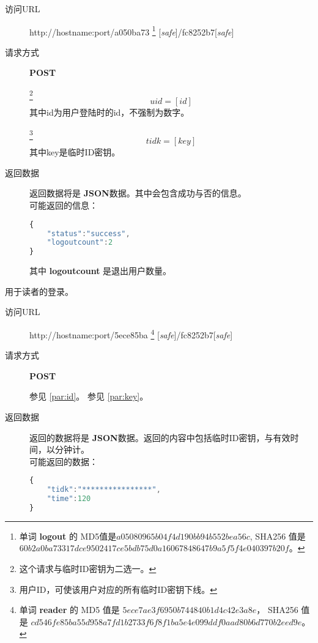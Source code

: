 \documentclass[UTF8]{ctexart}
\def\safe{[\textit{safe}]}
\def\POST{\textbf{POST}}
\def\bfJSON{\textbf{JSON}}
\begin{document}
    
    
    
    
    
    

    \begin{description}
        \item[访问URL] http://hostname:port/a050ba73
        \footnote{
            单词 \textbf{logout} 的
            MD5值是$a05080965b04f4d190bb94b552bea56c $,
            SHA256 值是
            $60b2a0ba73317dce9502417ce5bdb75d0a16067848647b9a5f5f4e040397b20f$。
        }
        [\textit{safe}]/fc8252b7[\textit{safe}]
        
        \item[请求方式] \textbf{POST}
        
        \label{par:logout:id}
        \footnote{这个请求与临时ID密钥为二选一。}
        $$uid=[id]$$
        其中id为用户登陆时的id，不强制为数字。
        
        \label{par:logout:tidk}
        \footnote{用户ID，可使该用户对应的所有临时ID密钥下线。}
        $$tidk=[key]$$
        其中key是临时ID密钥。
        
        \item[返回数据] 返回数据将是 \bfJSON 数据。其中会包含成功与否的信息。
        \\可能返回的信息：
        \begin{lstlisting}[language=JavaScript]
{
    "status":"success",
    "logoutcount":2
}
        \end{lstlisting}\label{par:logout:example}
        其中 \textbf{logoutcount} 是退出用户数量。
    \end{description}
    
    
    
    
    
    
		用于读者的登录。
		\begin{description}
            
		\item[访问URL] http://hostname:port/5ece85ba
        \footnote{单词 \textbf{reader} 的
            MD5 值是 
            $5ece7ae3f6950b744840b1d4c42e3a8e$，
            SHA256 值是
            $cd546fe85ba55d958a7fd1b2733f6f8f1ba5e4e099ddf0aad80b6d770b2eed9e$。
            }
        \safe/fc8252b7\safe
        
        \item[请求方式] \POST
        
         参见 \ref{par:id}。
         参见 \ref{par:key}。
        \item[返回数据] 返回的数据将是 \bfJSON 数据。返回的内容中包括临时ID密钥，与有效时间，以分钟计。
        \\可能返回的数据：
        \begin{lstlisting}[language=JavaScript]
{
    "tidk":"****************",
    "time":120
}
        \end{lstlisting}
		\end{description}
        
\end{document}
